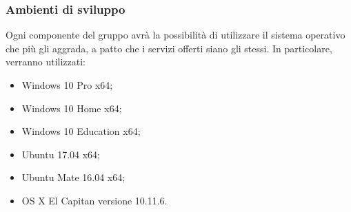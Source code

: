 \subsubsection{Ambienti di sviluppo}
	Ogni componente del gruppo avrà la possibilità di utilizzare il sistema operativo che più gli aggrada, a patto che i servizi offerti siano gli stessi. In particolare, verranno utilizzati:
	\begin{itemize}
		\item Windows 10 Pro x64;
		\item Windows 10 Home x64;
		\item Windows 10 Education x64;
		\item Ubuntu 17.04 x64;
		\item Ubuntu Mate 16.04 x64;
		\item OS X El Capitan versione 10.11.6.
	\end{itemize}
	
